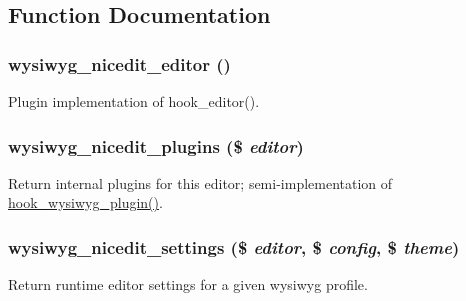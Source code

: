 \subsection{Function Documentation}
\hypertarget{nicedit_8inc_a8d4253f3374b29ad13987b030c4dc2f4}{
\subsubsection[{wysiwyg\_\-nicedit\_\-editor}]{\setlength{\rightskip}{0pt plus 5cm}wysiwyg\_\-nicedit\_\-editor ()}}
\label{nicedit_8inc_a8d4253f3374b29ad13987b030c4dc2f4}
Plugin implementation of hook\_\-editor(). \hypertarget{nicedit_8inc_a6aeb51d85563cf83611940ab3c34a872}{
\subsubsection[{wysiwyg\_\-nicedit\_\-plugins}]{\setlength{\rightskip}{0pt plus 5cm}wysiwyg\_\-nicedit\_\-plugins (\$ {\em editor})}}
\label{nicedit_8inc_a6aeb51d85563cf83611940ab3c34a872}
Return internal plugins for this editor; semi-\/implementation of \hyperlink{wysiwyg_8api_8php_abad2b35b32be0b20d73006b73205045c}{hook\_\-wysiwyg\_\-plugin()}. \hypertarget{nicedit_8inc_afd9ce25e90a2aff57911a3a456b99bf6}{
\subsubsection[{wysiwyg\_\-nicedit\_\-settings}]{\setlength{\rightskip}{0pt plus 5cm}wysiwyg\_\-nicedit\_\-settings (\$ {\em editor}, \/  \$ {\em config}, \/  \$ {\em theme})}}
\label{nicedit_8inc_afd9ce25e90a2aff57911a3a456b99bf6}
Return runtime editor settings for a given wysiwyg profile.


